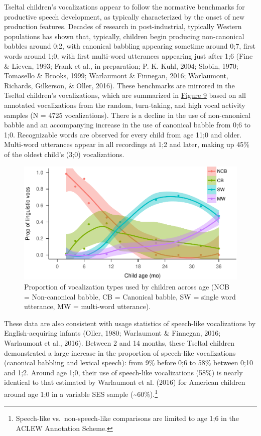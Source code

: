 \documentclass[floatsintext,man]{apa6}
\theoremstyle{definition}
\theoremstyle{definition}
\theoremstyle{definition}
\theoremstyle{remark}
\begin{document}
Tseltal children's vocalizations appear to follow the normative
benchmarks for productive speech development, as typically characterized
by the onset of new production features. Decades of research in
post-industrial, typically Western populations has shown that,
typically, children begin producing non-canonical babbles around 0;2,
with canonical babbling appearing sometime around 0;7, first words
around 1;0, with first multi-word utterances appearing just after 1;6
(Fine \& Lieven, 1993; Frank et al., in preparation; P. K. Kuhl, 2004;
Slobin, 1970; Tomasello \& Brooks, 1999; Warlaumont \& Finnegan, 2016;
Warlaumont, Richards, Gilkerson, \& Oller, 2016). These benchmarks are
mirrored in the Tseltal children's vocalizations, which are summarized
in \protect\hyperlink{fig9}{Figure 9} based on all annotated
vocalizations from the random, turn-taking, and high vocal activity
samples (N = 4725 vocalizations). There is a decline in the use of
non-canonical babble and an accompanying increase in the use of
canonical babble from 0;6 to 1;0. Recognizable words are observed for
every child from age 11;0 and older. Multi-word utterances appear in all
recordings at 1;2 and later, making up 45\% of the oldest child's (3;0)
vocalizations.

\begin{figure}
\centering
\includegraphics{Tseltal-CLE_files/figure-latex/fig9-1.pdf}
\caption{\label{fig:fig9}Proportion of vocalization types used by children
across age (NCB = Non-canonical babble, CB = Canonical babble, SW =
single word utterance, MW = multi-word utterance).}
\end{figure}

These data are also consistent with usage statistics of speech-like
vocalizations by English-acquiring infants (Oller, 1980; Warlaumont \&
Finnegan, 2016; Warlaumont et al., 2016). Between 2 and 14 months, these
Tseltal children demonstrated a large increase in the proportion of
speech-like vocalizations (canonical babbling and lexical speech): from
9\% before 0;6 to 58\% between 0;10 and 1;2. Around age 1;0, their use
of speech-like vocalizations (58\%) is nearly identical to that
estimated by Warlaumont et al. (2016) for American children around age
1;0 in a variable SES sample (\textasciitilde{}60\%).\footnote{Speech-like
  vs.~non-speech-like comparisons are limited to age 1;6 in the ACLEW
  Annotation Scheme.}
\end{document}
